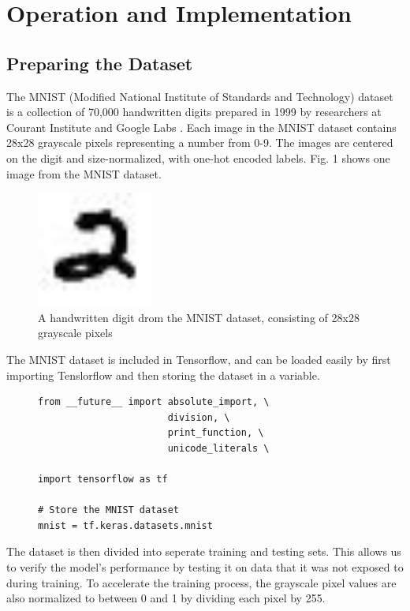 \documentclass[transmag]{IEEEtran}
\begin{document}
\section{Operation and Implementation}



\subsection{Preparing the Dataset}

The MNIST (Modified National Institute of Standards and Technology) dataset
is a collection of 70,000 handwritten digits prepared in 1999 by researchers at
Courant Institute and Google Labs \cite{ref1}. Each image in the MNIST dataset
contains 28x28 grayscale pixels representing a number from 0-9. The images are
centered on the digit and size-normalized, with one-hot encoded labels. Fig. 1
shows one image from the MNIST dataset.


\begin{figure}[H]
  \centerline{\includegraphics[width=1.5in]{fig1}}
  \caption{A handwritten digit drom the MNIST dataset, consisting of 28x28
  grayscale pixels\label{fig1}}
\end{figure}

The MNIST dataset is included in Tensorflow, and can be loaded easily by first
importing Tenslorflow and then storing the dataset in a variable.

\begin{figure}[H]
\begin{Verbatim}[samepage=true]
from __future__ import absolute_import, \
                       division, \
                       print_function, \
                       unicode_literals \

import tensorflow as tf

# Store the MNIST dataset
mnist = tf.keras.datasets.mnist
\end{Verbatim}
\end{figure}

The dataset is then divided into seperate training and testing sets.
This allows us to verify the model's performance by testing it on data that it
was not exposed to during training. To accelerate the training process, the 
grayscale pixel values are also normalized to between 0 and 1 by 
dividing each pixel by 255.
\end{document}
